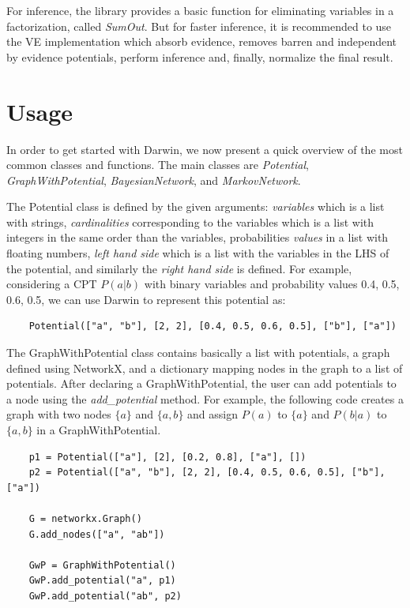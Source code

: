 For inference, the library provides a basic function for eliminating variables in a factorization, called \emph{SumOut}.
But for faster inference, it is recommended to use the VE implementation which absorb evidence, removes barren and independent by evidence potentials, perform inference and, finally, normalize the final result.

\section{Usage}
\label{sec:system:sec3}

In order to get started with Darwin, we now present a quick overview of the most common classes and functions.
The main classes are \emph{Potential}, \emph{GraphWithPotential}, \emph{BayesianNetwork}, and \emph{MarkovNetwork}.

The Potential class is defined by the given arguments: \emph{variables} which is a list with strings, \emph{cardinalities} corresponding to the variables which is a list with integers in the same order than the variables, probabilities \emph{values} in a list with floating numbers, \emph{left hand side} which is a list with the variables in the LHS of the potential, and similarly the \emph{right hand side} is defined.
For example, considering a CPT $P(a|b)$ with binary variables and probability values 0.4, 0.5, 0.6, 0.5, we can use Darwin to represent this potential as:
\begin{verbatim}
    Potential(["a", "b"], [2, 2], [0.4, 0.5, 0.6, 0.5], ["b"], ["a"])
\end{verbatim}

The GraphWithPotential class contains basically a list with potentials, a graph defined using NetworkX, and a dictionary mapping nodes in the graph to a list of potentials.
After declaring a GraphWithPotential, the user can add potentials to a node using the \emph{add\_potential} method.
For example, the following code creates a graph with two nodes $\{a\}$ and $\{a,b\}$ and assign $P(a)$ to $\{a\}$ and $P(b|a)$ to $\{a,b\}$ in a GraphWithPotential.
\begin{verbatim}
    p1 = Potential(["a"], [2], [0.2, 0.8], ["a"], [])
    p2 = Potential(["a", "b"], [2, 2], [0.4, 0.5, 0.6, 0.5], ["b"], ["a"])
    
    G = networkx.Graph()
    G.add_nodes(["a", "ab"])
    
    GwP = GraphWithPotential()
    GwP.add_potential("a", p1)
    GwP.add_potential("ab", p2)
\end{verbatim}

